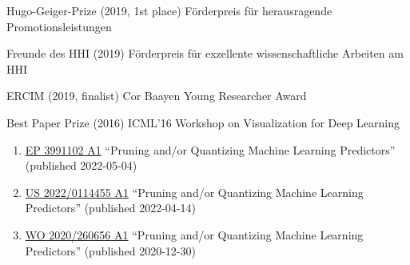 \documentclass[10pt,a4paper]{article} %
\begin{document}
\vspace{5pt}
\inlineheadsection %
{Hugo-Geiger-Prize (2019, 1st place)}
{
    F\"orderpreis f\"ur herausragende Promotionsleistungen
}

\vspace{5pt}
\inlineheadsection %
{Freunde des HHI (2019)}
{
    F\"orderpreis f\"ur exzellente wissenschaftliche Arbeiten am HHI
}

\vspace{5pt}
\inlineheadsection %
{ERCIM (2019, finalist)}
{
    Cor Baayen Young Researcher Award
}

\vspace{5pt}
\inlineheadsection %
{Best Paper Prize (2016)}
{
    ICML'16 Workshop on Visualization for Deep Learning
}


\spacedhrule{1.6em}{-0.4em} %

\newcommand{\patentref}[5]{\href{#4}{#1 #2} ``#3'' (granted #5)}
\newcommand{\patentpubref}[5]{\href{#4}{#1 #2} ``#3'' (published #5)}
{
    \begin{enumerate}
        \item [] \patentpubref{EP}
                                {3991102 A1}
                                {Pruning and/or Quantizing Machine Learning Predictors}
                                {https://patents.google.com/patent/EP3991102A1/en}
                                {2022-05-04}
        \item [] \patentpubref{US}
                                {2022/0114455 A1}
                                {Pruning and/or Quantizing Machine Learning Predictors}
                                {https://patentimages.storage.googleapis.com/36/80/74/01e3b22ef42a94/US20220114455A1.pdf}
                                {2022-04-14}
        \item [] \patentpubref{WO}
                                {2020/260656 A1}
                                {Pruning and/or Quantizing Machine Learning Predictors}
                                {https://patentimages.storage.googleapis.com/27/0b/d4/e3edd382b114fe/WO2020260656A1.pdf}
                                {2020-12-30}
    \end{enumerate}
}
\end{document}
